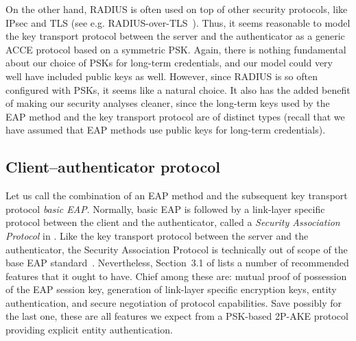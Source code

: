 On the other hand,
RADIUS is often used on top of other security protocols,
like IPsec and TLS
(see e.g. RADIUS-over-TLS~\cite{IETF:RFC6614:RADIUS_over_TLS}).
Thus,
it seems reasonable to model the key transport protocol between the server and the authenticator as a generic ACCE protocol based on  a symmetric PSK.
Again,
there is nothing fundamental about our choice of PSKs for long-term credentials,
and our model could very well have included public keys as well.
However,
since RADIUS is so often configured with PSKs,
it seems like a natural choice.
It also has the added benefit of making our security analyses cleaner,
since the long-term keys used by the EAP method and the key transport protocol are of distinct types
(recall that we have assumed that EAP methods use public keys for long-term credentials).  




\subsection{Client--authenticator protocol}\label{sec:generic_composition_results:modeling_EAP:link-layer}

Let us call the combination of an EAP method and the subsequent key transport protocol \emph{basic EAP}.
Normally,
basic EAP is followed by a link-layer specific protocol between the client and the authenticator,
called a \emph{Security Association Protocol} in \cite{IETF:RFC5247:EAP-key-management}.
Like the key transport protocol between the server and the authenticator,
the Security Association Protocol is technically out of scope of the base EAP standard~\cite{IETF:RFC3748:EAP}.
Nevertheless,
Section~3.1 of \cite{IETF:RFC5247:EAP-key-management} lists a number of recommended features that it ought to have.
Chief among these are:
mutual proof of possession of the EAP session key,
generation of link-layer specific encryption keys,
entity authentication,
and secure negotiation of protocol capabilities.
Save possibly for the last one,
these are all features we expect from a PSK-based 2P-AKE protocol providing explicit entity authentication.

